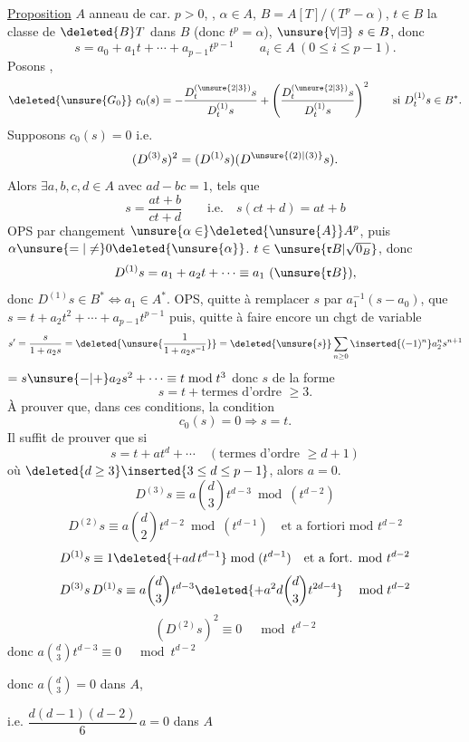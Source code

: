 \uline{Proposition}  $A$ anneau de car. $p>0$, , $\alpha\in A$, $B=A[T]/(T^p-\alpha)$, $t\in B$ la classe de $\deleted{B}T$ dans $B$ (donc $t^p=\alpha$), $\unsure{\forall|\exists}\ s\in B$, donc
\[
s=a_0+a_1t+\cdots+a_{p-1}t^{p-1}\qquad a_i\in A\ (0\le i\le p-1).
\]
Posons
,
\[
\deleted{\unsure{G_0}}\ c_0(s)=-\frac{D_t^{(\unsure{2|3})}s}{D_t^{(1)}s}+\left(\frac{D_t^{(\unsure{2|3})}s}{D_t^{(1)}s}\right)^2\qquad\text{si }D_t^{(1)}s\in B^*.
\]
Supposons $c_0(s)=0$ i.e.
\[
(D^{(3)}s)^2=(D^{(1)}s)(D^{\unsure{(2)|(3)}}s).
\]
Alors $\exists a,b,c,d\in A$  avec $ad-bc=1$, tels que
\[
s=\frac{at+b}{ct+d}\qquad\text{i.e.}\quad s(ct+d)=at+b
\]
OPS  par changement $\unsure{\alpha\in}\deleted{\unsure{A}}A^p$, puis $\alpha\unsure{=|\ne}0\deleted{\unsure{\alpha}}$.  $t\in\unsure{\mathfrak r B|\sqrt{0_B}}$, donc
\[
D^{(1)}s=a_1+a_2t+\cdots\equiv a_1\ (\unsure{\mathfrak r B}),
\]
donc $D^{(1)}s\in B^*\Longleftrightarrow a_1\in A^*$. OPS, quitte à remplacer $s$ par $a_1^{-1}(s-a_0)$, que $s=t+a_2t^2+\cdots+a_{p-1}t^{p-1}$ puis, quitte à faire encore un chgt de variable 
\[
s'=\frac{s}{1+a_2s}=\deleted{\unsure{\frac1{1+a_2s^{-1}}}}=\deleted{\unsure{s}}\sum_{n\ge0}\inserted{(-1)^n}a_2^n s^{n+1}
\]
$=s\unsure{-|+}a_2s^2+\cdots\equiv t\bmod t^3$ donc $s$ de la forme
\[
s=t+\text{termes d'ordre }\ge3.
\]
 À prouver que, dans ces conditions, la condition
\[
c_0(s)=0\Longrightarrow s=t.
\]
 Il suffit de prouver que si
\[
s=t+at^d+\cdots\quad(\text{termes d'ordre }\ge d+1)
\]
où $\deleted{d\ge3}\inserted{3\le d\le p-1}$, alors $a=0$.
\[
D^{(3)}s\equiv a\binom d3t^{d-3}\bmod(t^{d-2})
\]
\[
D^{(2)}s\equiv a\binom d2t^{d-2}\bmod(t^{d-1})\quad\text{et a fortiori mod }t^{d-2}
\]
\[
D^{(1)}s\equiv1\deleted{+ad\,t^{d-1}}\bmod(t^{d-1})\quad\text{et a fort. mod }t^{d-2}
\]
\[
D^{(3)}s\,D^{(1)}s\equiv a\binom d3t^{d-3}\deleted{+a^2d\binom d3t^{2d-4}}\quad\bmod t^{d-2}
\]
\[
(D^{(2)}s)^2\equiv0\quad\bmod t^{d-2}
\]
donc $a\binom d3t^{d-3}\equiv0\quad\bmod t^{d-2}$

donc $a\binom d3=0$ dans $A$,

i.e. $\dfrac{d(d-1)(d-2)}6\,a=0$ dans $A$

